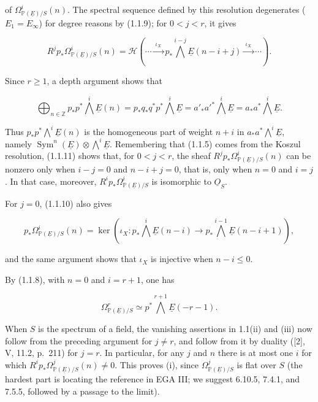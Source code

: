 of $\Omega^i_{\mathbb P(\underline E)/S}(n)$.  The spectral sequence
defined by this resolution degenerates ($E_1=E_\infty$) for degree reasons
by (1.1.9); for $0<j<r$, it gives

\begin{equation}\tag{1.1.11}
R^jp_*\Omega^i_{\mathbb P(\underline E)/S}(n)
=\mathcal H\left(\cdots\xrightarrow{\ \iota_X\ }
p_*\bigwedge^{i-j}\underline E(n-i+j)
\xrightarrow{\ \iota_X\ }\cdots\right).
\end{equation}

Since $r\geq1$, a depth argument shows that

\begin{equation}\tag{1.1.12}
\bigoplus_{n\in\mathbb Z}p_*p^*\bigwedge^i\underline E(n)
=p_*q_*q^*p^*\bigwedge^i\underline E
={a'}_*{a'}^*\bigwedge^i\underline E
=a_*a^*\bigwedge^i\underline E.
\end{equation}


Thus $p_*p^*\bigwedge^i\underline E(n)$ is the homogeneous part of weight
$n+i$ in $a_*a^*\bigwedge^i\underline E$, namely
$\operatorname{Sym}^n(\underline E)\otimes\bigwedge^i\underline E$.
Remembering that (1.1.5) comes from the Koszul resolution, (1.1.11) shows
that, for $0<j<r$, the sheaf
$R^jp_*\Omega^i_{\mathbb P(\underline E)/S}(n)$ can be nonzero only when
$i-j=0$ and $n-i+j=0$, that is, only when $n=0$ and $i=j$.  In that case,
moreover, $R^ip_*\Omega^i_{\mathbb P(\underline E)/S}$ is isomorphic to
$\underline O_S$.

For $j=0$, (1.1.10) also gives

\begin{equation}\tag{1.1.13}
p_*\Omega^i_{\mathbb P(\underline E)/S}(n)
=\ker\!\left(\iota_X:
p_*\bigwedge^i\underline E(n-i)\longrightarrow
p_*\bigwedge^{i-1}\underline E(n-i+1)\right),
\end{equation}

and the same argument shows that $\iota_X$ is injective when $n-i\leq0$.

By (1.1.8), with $n=0$ and $i=r+1$, one has

\begin{equation*}
\Omega^r_{\mathbb P(\underline E)/S}\simeq
p^*\bigwedge^{r+1}\underline E(-r-1).
\end{equation*}

When $S$ is the spectrum of a field, the vanishing assertions in 1.1(ii)
and (iii) now follow from the preceding argument for $j\ne r$, and follow
from it by duality ([2], V, 11.2, p.~211) for $j=r$.  In particular, for
any $j$ and $n$ there is at most one $i$ for which
$R^ip_*\Omega^j_{\mathbb P(\underline E)/S}(n)\ne0$.  This proves (i),
since $\Omega^j_{\mathbb P(\underline E)/S}$ is flat over $S$ (the hardest
part is locating the reference in EGA III; we suggest 6.10.5, 7.4.1, and
7.5.5, followed by a passage to the limit).

